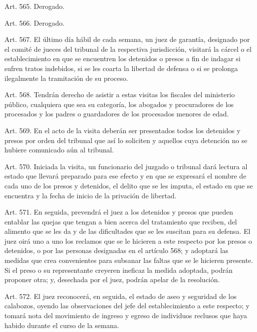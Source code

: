     Art. 565. Derogado.


    Art. 566. Derogado.

    Art. 567. El último día hábil de cada semana, un juez de garantía, designado por el comité de jueces del tribunal de la respectiva jurisdicción, visitará la cárcel o el establecimiento en que se encuentren los detenidos o presos a fin de indagar si sufren tratos indebidos, si se les coarta la libertad de defensa o si se prolonga ilegalmente la tramitación de su proceso.



    Art. 568. Tendrán derecho de asistir a estas visitas los fiscales del ministerio público, cualquiera que sea su categoría, los abogados y procuradores de los procesados y los padres o guardadores de los procesados menores de edad.



    Art. 569. En el acto de la visita deberán ser presentados todos los detenidos y presos por orden del tribunal que así lo soliciten y aquellos cuya detención no se hubiere comunicado aún al tribunal.


    Art. 570. Iniciada la visita, un funcionario del juzgado o tribunal dará lectura al estado que llevará preparado para ese efecto y en que se expresará el nombre de cada uno de los presos y detenidos, el delito que se les imputa, el estado en que se encuentra y la fecha de inicio de la privación de libertad.



    Art. 571. En seguida, prevendrá el juez a los detenidos y presos que pueden entablar las quejas que tengan a bien acerca del tratamiento que reciben, del alimento que se les da y de las dificultades que se les suscitan para su defensa.
    El juez oirá uno a uno los reclamos que se le hicieren a este respecto por los presos o detenidos, o por las personas designadas en el artículo 568; y adoptará las medidas que crea convenientes para subsanar las faltas que se le hicieren presente. Si el preso o su representante creyeren ineficaz la medida adoptada, podrán proponer otra; y, desechada por el juez, podrán apelar de la resolución.



    Art. 572. El juez reconocerá, en seguida, el estado de aseo y seguridad de los calabozos, oyendo las observaciones del jefe del establecimiento a este respecto; y tomará nota del movimiento de ingreso y egreso de individuos reclusos que haya habido durante el curso de la semana.




